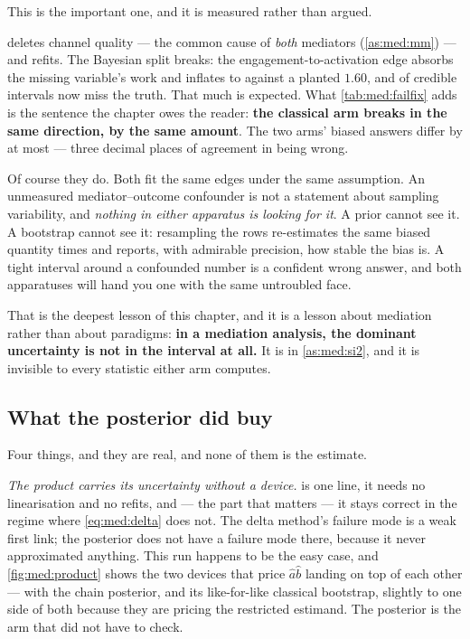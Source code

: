 This is the important one, and it is measured rather than argued.

 deletes channel quality --- the common cause of \emph{both} mediators
(\cref{as:med:mm}) --- and refits. The Bayesian split breaks: the engagement-to-activation edge
absorbs the missing variable's work and inflates to \nbFourBadAEng{} against a planted $1.60$, and
\nbFourBadNMiss{} of \nbFourNEstimands{} credible intervals now miss the truth. That much is
expected. What \cref{tab:med:failfix} adds is the sentence the chapter owes the reader:
\textbf{the classical arm breaks in the same direction, by the same amount}. The two arms' biased
answers differ by at most \nbFourBadArmGap{} --- three decimal places of agreement in being wrong.

Of course they do. Both fit the same edges under the same assumption. An unmeasured
mediator--outcome confounder is not a statement about sampling variability, and \emph{nothing in
either apparatus is looking for it}. A prior cannot see it. A bootstrap cannot see it: resampling the
rows re-estimates the same biased quantity \nbFourNBoot{} times and reports, with admirable
precision, how stable the bias is. A tight interval around a confounded number is a confident wrong
answer, and both apparatuses will hand you one with the same untroubled face.

That is the deepest lesson of this chapter, and it is a lesson about mediation rather than about
paradigms: \textbf{in a mediation analysis, the dominant uncertainty is not in the interval at all.}
It is in \cref{as:med:si2}, and it is invisible to every statistic either arm computes.

\subsection*{What the posterior did buy}

Four things, and they are real, and none of them is the estimate.

\emph{The product carries its uncertainty without a device.}  is one line, it
needs no linearisation and no \nbFourNBoot{} refits, and --- the part that matters --- it stays
correct in the regime where \cref{eq:med:delta} does not. The delta method's failure mode is a weak
first link; the posterior does not have a failure mode there, because it never approximated anything.
This run happens to be the easy case, and \cref{fig:med:product} shows the two devices that price
$\hat a\hat b$ landing on top of each other --- with the chain posterior, and its like-for-like
classical bootstrap, slightly to one side of both because they are pricing the restricted estimand.
The posterior is the arm that did not have to check.

